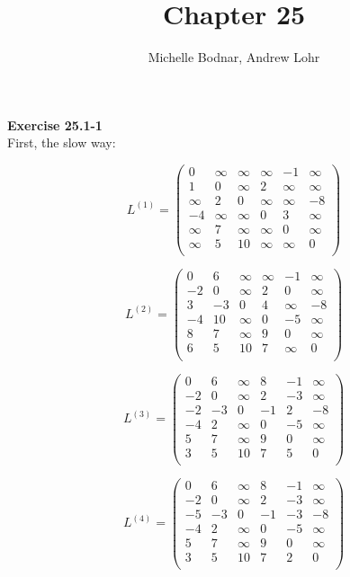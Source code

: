 \documentclass{article}
\title{Chapter 25}
\author{Michelle Bodnar, Andrew Lohr}
\begin{document}
\maketitle
\noindent\textbf{Exercise 25.1-1}\\

First, the slow way:

\[
L^{(1)} = \left(\begin{array}{cccccc}
0&\infty&\infty&\infty&-1&\infty\\
1&0&\infty&2&\infty&\infty\\
\infty&2&0&\infty&\infty&-8\\
-4&\infty&\infty&0&3&\infty\\
\infty&7&\infty&\infty&0&\infty\\
\infty&5&10&\infty&\infty&0\\
\end{array}\right)
\]

\[
L^{(2)} = \left(\begin{array}{cccccc}
0&6&\infty&\infty&-1&\infty\\
-2&0&\infty&2&0&\infty\\
3&-3&0&4&\infty&-8\\
-4&10&\infty&0&-5&\infty\\
8&7&\infty&9&0&\infty\\
6&5&10&7&\infty&0\\
\end{array}\right)
\]

\[
L^{(3)} = \left(\begin{array}{cccccc}
0&6&\infty&8&-1&\infty\\
-2&0&\infty&2&-3&\infty\\
-2&-3&0&-1&2&-8\\
-4&2&\infty&0&-5&\infty\\
5&7&\infty&9&0&\infty\\
3&5&10&7&5&0\\
\end{array}\right)
\]

\[
L^{(4)} = \left(\begin{array}{cccccc}
0&6&\infty&8&-1&\infty\\
-2&0&\infty&2&-3&\infty\\
-5&-3&0&-1&-3&-8\\
-4&2&\infty&0&-5&\infty\\
5&7&\infty&9&0&\infty\\
3&5&10&7&2&0\\
\end{array}\right)
\]
\end{document}
